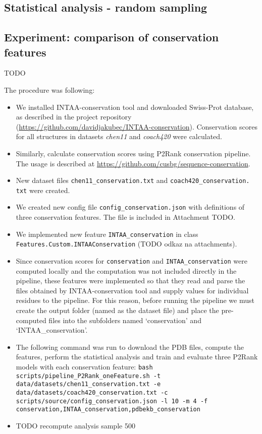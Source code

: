 \documentclass[12pt,a4paper]{report}
\begin{document}
\subsection{Statistical analysis - random sampling}

\subsection{Experiment: comparison of conservation features}

TODO

The procedure was following:
\begin{itemize}
\item We installed INTAA-conservation tool and downloaded Swiss-Prot database, as described in the project repository (\url{https://github.com/davidjakubec/INTAA-conservation}). Conservation scores for all structures in datasets \textit{chen11} and \textit{coach420} were calculated.
\item Similarly, calculate conservation scores using P2Rank conservation pipeline. The usage is described at \url{https://github.com/cusbg/sequence-conservation}.
\item New dataset files \texttt{chen11\_conservation.txt} and \texttt{coach420\_conservation. txt} were created.
\item We created new config file \texttt{config\_conservation.json} with definitions of three conservation features. The file is included in Attachment TODO. 
\item We implemented new feature \texttt{INTAA\_conservation} in class \texttt{Features.Custom.INTAAConservation} (TODO odkaz na attachments).
\item Since conservation scores for \texttt{conservation} and \texttt{INTAA\_conservation} were computed locally and the computation was not included directly in the pipeline, these features were implemented so that they read and parse the files obtained by INTAA-conservation tool and supply values for individual residues to the pipeline. For this reason, before running the pipeline we must create the output folder (named as the dataset file) and place the pre-computed files into the subfolders named `conservation' and `INTAA\_conservation'.
\item The following command was run to download the PDB files, compute the features, perform the statistical analysis and train and evaluate three P2Rank models with each conservation feature: \texttt{bash scripts/pipeline\_P2Rank\_oneFeature.sh -t data/datasets/chen11\_conservation.txt -e data/datasets/coach420\_conservation.txt -c scripts/source/config\_conservation.json -l 10 -m 4 -f conservation,INTAA\_conservation,pdbekb\_conservation}
\item TODO recompute analysis sample 500
\end{itemize}
\end{document}
